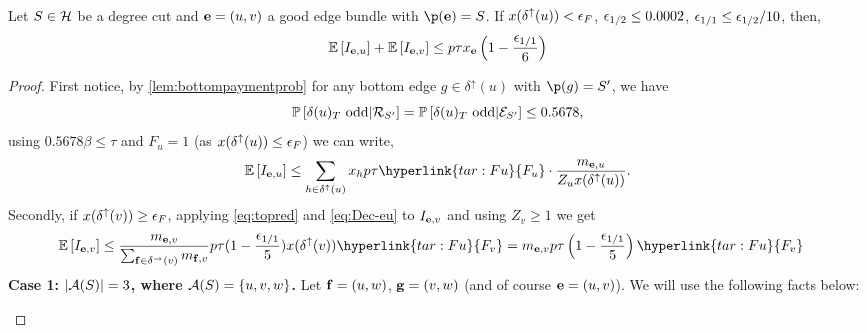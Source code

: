 \begin{lemma}\label{lem:xdeltau<=epsF}
Let $S\in\mathcal{H}$ be a degree cut and ${\bf e}=(u,v)$ a good edge bundle with $\p(\bbe)=S$. If $x(\delta ^\uparrow(u)) < {\epsilon}_F$, ${\epsilon}_{1/2}\leq 0.0002$, ${\epsilon}_{1/1}\leq {\epsilon}_{1/2}/10$, then, 
$${\mathbb{E}}\left[I_{{\bf e},u}\right]+ {\mathbb{E}}\left[I_{{\bf e},v}\right] \le p\tau x_{\bf e} \left(1 -\frac{{\epsilon}_{1/1}}{6}\right)$$ 
\end{lemma}
\begin{proof}
First notice, by \cref{lem:bottompaymentprob} for any bottom edge $g\in\delta^\uparrow(u)$ with $\p(g)=S'$, we have
$${\mathbb{P}}\left[\delta(u)_T\text{ odd} | {\mathcal{R}}_{S'}\right] = {\mathbb{P}}\left[\delta(u)_T\text{ odd} | {\cal E}_{S'}\right] \leq 0.5678,$$
using $0.5678\beta \leq \tau$ and $F_u = 1$ (as $x(\delta^\uparrow(u)) \le {\epsilon}_F$) we can write,
\begin{align}\label{eq:Ieu3exp}
\E{I_{\bbe,u}} \leq	\sum_{h \in \delta ^\uparrow (u)} x_h p \tau \hyperlink{tar:Fu}{F_u}\cdot \frac{ m_{\bbe,u}}{ Z_u x (\delta ^\uparrow (u))}.
\end{align}
Secondly, if $x(\delta^\uparrow(v))\geq {\epsilon}_F$,  applying  \eqref{eq:topred} and \eqref{eq:Dec-eu} to $I_{{\bf e},v}$ and using $Z_v \ge 1$ we get %
\begin{align}\label{eq:Ievexp3}
\E{I_{\bbe,v}} &\le \frac{m_{\bbe,v}}{\sum_{\bbf\in\delta^\rightarrow(v)} m_{\bbf,v}}
p\tau(1-\frac{\eps_{1/1}}{5})x(\delta^\uparrow(v)) \hyperlink{tar:Fu}{F_v} = m_{\bbe,v}p\tau\left(1-\frac{\eps_{1/1}}{5}\right)\hyperlink{tar:Fu}{F_v}
\end{align}
\textbf{Case 1: $|{\cal A}(S)|=3$, where ${\cal A}(S)=\{u,v,w\}$.} Let ${\bf f} = (u,w)$,  ${\bf g} = (v,w)$ (and of course ${\bf e} = (u,v)$). We will use the following facts below:  
\begin{figure}[htb]%
\centering	

\end{figure}
\end{proof}
